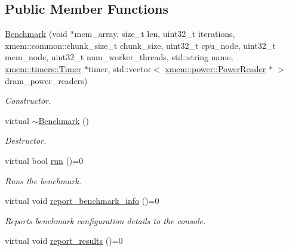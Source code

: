 \subsection*{Public Member Functions}
\begin{DoxyCompactItemize}
\item 
\hyperlink{classxmem_1_1benchmark_1_1_benchmark_a6eda9023866fc80e334d7d8d2a220817}{Benchmark} (void $\ast$mem\-\_\-array, size\-\_\-t len, uint32\-\_\-t iterations, xmem\-::common\-::chunk\-\_\-size\-\_\-t chunk\-\_\-size, uint32\-\_\-t cpu\-\_\-node, uint32\-\_\-t mem\-\_\-node, uint32\-\_\-t num\-\_\-worker\-\_\-threads, std\-::string name, \hyperlink{classxmem_1_1timers_1_1_timer}{xmem\-::timers\-::\-Timer} $\ast$timer, std\-::vector$<$ \hyperlink{classxmem_1_1power_1_1_power_reader}{xmem\-::power\-::\-Power\-Reader} $\ast$ $>$ dram\-\_\-power\-\_\-readers)
\begin{DoxyCompactList}\small\item\em Constructor. \end{DoxyCompactList}\item 
\hypertarget{classxmem_1_1benchmark_1_1_benchmark_a20476e07f09e2b20ed3e9a7f13a570e6}{virtual \hyperlink{classxmem_1_1benchmark_1_1_benchmark_a20476e07f09e2b20ed3e9a7f13a570e6}{$\sim$\-Benchmark} ()}\label{classxmem_1_1benchmark_1_1_benchmark_a20476e07f09e2b20ed3e9a7f13a570e6}

\begin{DoxyCompactList}\small\item\em Destructor. \end{DoxyCompactList}\item 
virtual bool \hyperlink{classxmem_1_1benchmark_1_1_benchmark_aa0dbe60e525457770c835c6c72a0be6a}{run} ()=0
\begin{DoxyCompactList}\small\item\em Runs the benchmark. \end{DoxyCompactList}\item 
\hypertarget{classxmem_1_1benchmark_1_1_benchmark_ae788ccb9d65f543b1bc59f963ec5f2e2}{virtual void \hyperlink{classxmem_1_1benchmark_1_1_benchmark_ae788ccb9d65f543b1bc59f963ec5f2e2}{report\-\_\-benchmark\-\_\-info} ()=0}\label{classxmem_1_1benchmark_1_1_benchmark_ae788ccb9d65f543b1bc59f963ec5f2e2}

\begin{DoxyCompactList}\small\item\em Reports benchmark configuration details to the console. \end{DoxyCompactList}\item 
\hypertarget{classxmem_1_1benchmark_1_1_benchmark_ad9b74db44f972909dcba85dd32cef0a3}{virtual void \hyperlink{classxmem_1_1benchmark_1_1_benchmark_ad9b74db44f972909dcba85dd32cef0a3}{report\-\_\-results} ()=0}\label{classxmem_1_1benchmark_1_1_benchmark_ad9b74db44f972909dcba85dd32cef0a3}


\end{DoxyCompactItemize}
